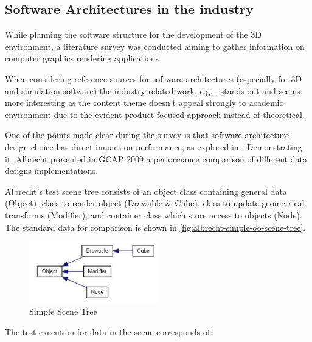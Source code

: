 \subsection{Software Architectures in the industry}

    While planning the software structure for the development of the 3D environment, a literature survey was conducted aiming to gather information on computer graphics rendering applications. 

    When considering reference sources for software architectures (especially for 3D and simulation software) the industry related work, e.g. \cite{leonard-thief-postmortem}, stands out and seems more interesting as the content theme doesn't appeal strongly to academic environment due to the evident product focused approach instead of theoretical.
    
    One of the points made clear during the survey is that software architecture design choice has direct impact on performance, as explored in \cite{albrecht-pitfalls-OOP-GCAP09}. Demonstrating it, Albrecht presented in GCAP 2009 a performance comparison of different data designs implementations. 
    
    Albrecht's test scene tree consists of an object class containing general data (Object), class to render object (Drawable & Cube), class to update geometrical transforms (Modifier), and container class which store access to objects (Node). The standard data for comparison is shown in \autoref{fig:albrecht-simple-oo-scene-tree}. 
    
    \begin{figure}[H]
        \caption{
        \label{fig:albrecht-simple-oo-scene-tree}
            Simple Scene Tree
        }
        \begin{center}
        \includegraphics[width=0.5\textwidth]{images/albrecht-simple-oo-scene-tree.png}
        \end{center}
    \end{figure}    
    
    The test execution for data in the scene corresponds of:
    
